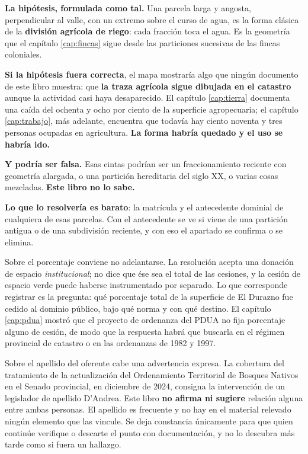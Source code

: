 \begin{cautela}
\textbf{La hipótesis, formulada como tal.} Una parcela larga y angosta, perpendicular al valle,
con un extremo sobre el curso de agua, es la forma clásica de la \textbf{división agrícola de
riego}: cada fracción toca el agua. Es la geometría que el capítulo \ref{cap:fincas} sigue desde
las particiones sucesivas de las fincas coloniales.

\textbf{Si la hipótesis fuera correcta}, el mapa mostraría algo que ningún documento de este
libro muestra: que \textbf{la traza agrícola sigue dibujada en el catastro} aunque la actividad
casi haya desaparecido. El capítulo \ref{cap:tierra} documenta una caída del ochenta y ocho por
ciento de la superficie agropecuaria; el capítulo \ref{cap:trabajo}, más adelante, encuentra que todavía hay
ciento noventa y tres personas ocupadas en agricultura. \textbf{La forma habría quedado y el uso
se habría ido.}

\textbf{Y podría ser falsa.} Esas cintas podrían ser un fraccionamiento reciente con geometría
alargada, o una partición hereditaria del siglo XX, o varias cosas mezcladas. \textbf{Este libro
no lo sabe.}

\textbf{Lo que lo resolvería es barato}: la matrícula y el antecedente dominial de cualquiera de
esas parcelas. Con el antecedente se ve si viene de una partición antigua o de una subdivisión
reciente, y con eso el apartado se confirma o se elimina.
\end{cautela}

\begin{cautela}
Sobre el porcentaje conviene no adelantarse. La resolución acepta una donación de espacio \textit{institucional}; no dice que ése sea el total de las cesiones, y la cesión de espacio verde puede haberse instrumentado por separado. Lo que corresponde registrar es la pregunta: qué porcentaje total de la superficie de El Durazno fue cedido al dominio público, bajo qué norma y con qué destino. El capítulo \ref{cap:pdua} mostró que el proyecto de ordenanza del PDUA no fija porcentaje alguno de cesión, de modo que la respuesta habrá que buscarla en el régimen provincial de catastro o en las ordenanzas de 1982 y 1997.

Sobre el apellido del oferente cabe una advertencia expresa. La cobertura del tratamiento de la actualización del Ordenamiento Territorial de Bosques Nativos en el Senado provincial, en diciembre de 2024, consigna la intervención de un legislador de apellido D'Andrea. Este libro \textbf{no afirma ni sugiere} relación alguna entre ambas personas. El apellido es frecuente y no hay en el material relevado ningún elemento que las vincule. Se deja constancia únicamente para que quien continúe verifique o descarte el punto con documentación, y no lo descubra más tarde como si fuera un hallazgo.
\end{cautela}

